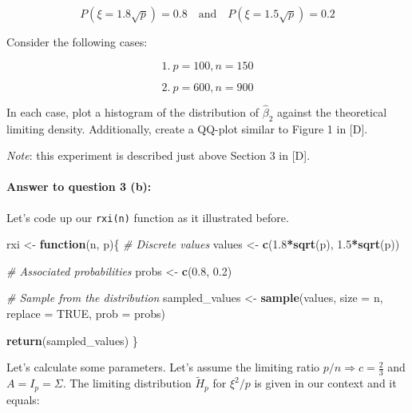 \documentclass[
]{article}
\newenvironment{Shaded}{\begin{snugshade}}{\end{snugshade}}
\newcommand{\AttributeTok}[1]{\textcolor[rgb]{0.13,0.29,0.53}{#1}}
\newcommand{\CommentTok}[1]{\textcolor[rgb]{0.56,0.35,0.01}{\textit{#1}}}
\newcommand{\ConstantTok}[1]{\textcolor[rgb]{0.56,0.35,0.01}{#1}}
\newcommand{\ControlFlowTok}[1]{\textcolor[rgb]{0.13,0.29,0.53}{\textbf{#1}}}
\newcommand{\FloatTok}[1]{\textcolor[rgb]{0.00,0.00,0.81}{#1}}
\newcommand{\FunctionTok}[1]{\textcolor[rgb]{0.13,0.29,0.53}{\textbf{#1}}}
\newcommand{\NormalTok}[1]{#1}
\newcommand{\OtherTok}[1]{\textcolor[rgb]{0.56,0.35,0.01}{#1}}
\newcommand{\SpecialCharTok}[1]{\textcolor[rgb]{0.81,0.36,0.00}{\textbf{#1}}}
\begin{document}
\[
P(\xi = 1.8\sqrt{p}) = 0.8 \quad \text{and} \quad P(\xi = 1.5\sqrt{p}) = 0.2
\]

Consider the following cases:

\[1.  \ p = 100, n = 150\]

\[
2.\ p = 600, n = 900
\]

In each case, plot a histogram of the distribution of \(\hat{\beta}_2\)
against the theoretical limiting density. Additionally, create a QQ-plot
similar to Figure 1 in {[}D{]}.

\emph{Note}: this experiment is described just above Section 3 in
{[}D{]}.

\paragraph{\texorpdfstring{\textbf{Answer to question 3
(b)}:}{Answer to question 3 (b):}}\label{answer-to-question-3-b}

Let's code up our \texttt{rxi(n)} function as it illustrated before.

\begin{Shaded}
\begin{Highlighting}[]
\NormalTok{rxi }\OtherTok{\textless{}{-}} \ControlFlowTok{function}\NormalTok{(n, p)\{}
  \CommentTok{\# Discrete values}
\NormalTok{  values }\OtherTok{\textless{}{-}} \FunctionTok{c}\NormalTok{(}\FloatTok{1.8}\SpecialCharTok{*}\FunctionTok{sqrt}\NormalTok{(p), }\FloatTok{1.5}\SpecialCharTok{*}\FunctionTok{sqrt}\NormalTok{(p))}
  
  \CommentTok{\# Associated probabilities}
\NormalTok{  probs }\OtherTok{\textless{}{-}} \FunctionTok{c}\NormalTok{(}\FloatTok{0.8}\NormalTok{, }\FloatTok{0.2}\NormalTok{)}
  
  \CommentTok{\# Sample from the distribution}
\NormalTok{  sampled\_values }\OtherTok{\textless{}{-}} \FunctionTok{sample}\NormalTok{(values, }\AttributeTok{size =}\NormalTok{ n, }\AttributeTok{replace =} \ConstantTok{TRUE}\NormalTok{, }\AttributeTok{prob =}\NormalTok{ probs)}
  
  \FunctionTok{return}\NormalTok{(sampled\_values)}
\NormalTok{\}}
\end{Highlighting}
\end{Shaded}

Let's calculate some parameters. Let's assume the limiting ratio
\(p/n \Rightarrow c = \frac{2}{3}\) and \(A=I_p = \Sigma\). The limiting
distribution \(\tilde H_p\) for \(\xi^2/p\) is given in our context and
it equals:
\end{document}
